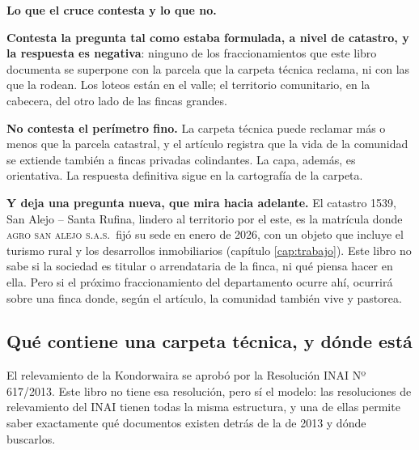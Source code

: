 \begin{cautela}
\textbf{Lo que el cruce contesta y lo que no.}

\textbf{Contesta la pregunta tal como estaba formulada, a nivel de catastro, y la respuesta es negativa}: ninguno de los fraccionamientos que este libro documenta se superpone con la parcela que la carpeta técnica reclama, ni con las que la rodean. Los loteos están en el valle; el territorio comunitario, en la cabecera, del otro lado de las fincas grandes.

\textbf{No contesta el perímetro fino.} La carpeta técnica puede reclamar más o menos que la parcela catastral, y el artículo registra que la vida de la comunidad se extiende también a fincas privadas colindantes. La capa, además, es orientativa. La respuesta definitiva sigue en la cartografía de la carpeta.

\textbf{Y deja una pregunta nueva, que mira hacia adelante.} El catastro 1539, San Alejo -- Santa Rufina, lindero al territorio por el este, es la matrícula donde \textsc{agro san alejo s.a.s.}\ fijó su sede en enero de 2026, con un objeto que incluye el turismo rural y los desarrollos inmobiliarios (capítulo \ref{cap:trabajo}). Este libro no sabe si la sociedad es titular o arrendataria de la finca, ni qué piensa hacer en ella. Pero si el próximo fraccionamiento del departamento ocurre ahí, ocurrirá sobre una finca donde, según el artículo, la comunidad también vive y pastorea.
\end{cautela}

\subsection*{Qué contiene una carpeta técnica, y dónde está}

El relevamiento de la Kondorwaira se aprobó por la Resolución INAI Nº 617/2013. Este libro no
tiene esa resolución, pero sí el modelo: las resoluciones de relevamiento del INAI tienen
todas la misma estructura, y una de ellas permite saber exactamente qué documentos existen
detrás de la de 2013 y dónde buscarlos.

